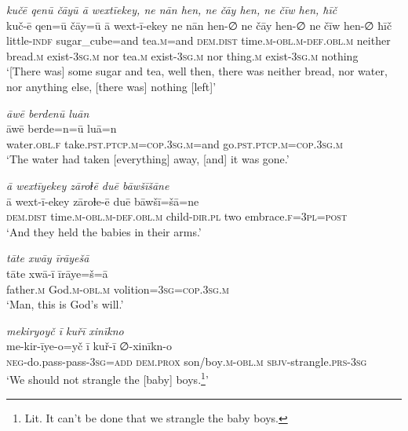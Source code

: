 \ea \label{ZB.29}
\textit{kučē qenū čāyū ā wextīekey, ne nān hen, ne čāy hen, ne čīw hen, ħīč} \\ 
\gll kuč-ē qen=ū čāy=ū ā wext-ī-ekey ne nān hen-∅ ne čāy hen-∅ ne čīw hen-∅ ħīč \\ 
 little\textsc{-indf} sugar\_cube=and tea\textsc{.m}=and \textsc{dem.dist} time\textsc{.m}\textsc{-obl}\textsc{.m}\textsc{-def}\textsc{.obl}\textsc{.m} neither bread\textsc{.m} exist\textsc{-3sg}\textsc{.m} nor tea\textsc{.m} exist\textsc{-3sg}\textsc{.m} nor thing\textsc{.m} exist\textsc{-3sg}\textsc{.m} nothing \\ 
\glt `[There was] some sugar and tea, well then, there was neither bread, nor water, nor anything else, [there was] nothing [left]'
\z 
 
\ea \label{ZB.30}
\textit{āwē berdenū luān} \\ 
\gll āwē berde=n=ū luā=n \\ 
 water\textsc{.obl}\textsc{.f} take\textsc{.pst}\textsc{.ptcp}\textsc{.m}\textsc{=cop}\textsc{.3sg}\textsc{.m}=and go\textsc{.pst}\textsc{.ptcp}\textsc{.m}\textsc{=cop}\textsc{.3sg}\textsc{.m} \\ 
\glt `The water had taken [everything] away, [and] it was gone.'
\z 
 
\ea \label{ZB.32}
\textit{ā wextīyekey zāroɫē duē bāwšīšāne} \\ 
\gll ā wext-ī-ekey zāroɫe-ē duē bāwšī=šā=ne \\ 
 \textsc{dem.dist} time\textsc{.m}\textsc{-obl}\textsc{.m}\textsc{-def}\textsc{.obl}\textsc{.m} child\textsc{-dir}\textsc{.pl} two embrace\textsc{.f}\textsc{=3pl}\textsc{=\textsc{post}} \\ 
\glt `And they held the babies in their arms.'
\z 
 
\ea \label{ZB.34}
\textit{tāte xwāy īrāyešā} \\ 
\gll tāte xwā-ī īrāye=š=ā \\ 
 father\textsc{.m} God\textsc{.m}\textsc{-obl}\textsc{.m} volition\textsc{=3sg}\textsc{=cop}\textsc{.3sg}\textsc{.m} \\ 
\glt `Man, this is God’s will.'
\z 
 
\ea \label{ZB.35}
\textit{mekiryoyč ī kuřī xinīkno} \\ 
\gll me-kir-īye-o=yč ī kuř-ī ∅-xinīkn-o \\ 
 \textsc{neg-}do.pass-pass\textsc{-3sg}\textsc{=add} \textsc{dem.prox} son/boy\textsc{.m}\textsc{-obl}\textsc{.m} \textsc{sbjv}-strangle\textsc{.prs}\textsc{-3sg} \\ 
\glt `We should not strangle the [baby] boys.\footnote{Lit. It can't be done that we strangle the baby boys.}'
\z 
 
